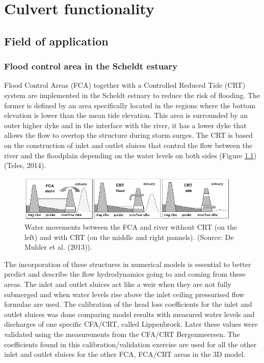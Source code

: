 \chapter{Culvert functionality}

\section{Field of application}

\subsection{Flood control area in the Scheldt estuary}
Flood Control Areas (FCA) together with a Controlled Reduced Tide (CRT) system
are implemented in the Scheldt estuary to reduce the risk of flooding.
The former is defined by an area specifically located in the regions where
the bottom elevation is lower than the mean tide elevation.
This area is surrounded by an outer higher dyke and in the interface with the river,
it has a lower dyke that allows the flow to overtop the structure during storm surges.
The CRT is based on the construction of inlet and outlet sluices that control the
flow between the river and the floodplain depending on the water levels on both
sides (Figure \ref{fig:culvert_fig1}) (Teles, 2014).

\begin{figure}[H]
\begin{center}
  \includegraphics[width=0.95\textwidth]{culvert_fig1.png}
\end{center}
\caption{Water movements between the FCA and river without
CRT (on the left) and with CRT (on the middle and right pannels).
(Source: De Mulder et al. (2013)).}
\label{fig:culvert_fig1}
\end{figure}

The incorporation of these structures in numerical models is essential
to better predict and describe the flow hydrodynamics going to and
coming from these areas. The inlet and outlet sluices act like a weir
when they are not fully submerged and when water levels rise above the
inlet ceiling pressurised flow formulae are used.
The calibration of the head loss coefficients for the inlet and outlet sluices
was done comparing model results with measured water levels and discharges of
one specific CFA/CRT, called Lippenbroek.
Later these values were validated using the measurements from the CFA/CRT Bergenmeersen.
The coefficients found in this calibration/validation exercise are used for all the
other inlet and outlet sluices for the other FCA, FCA/CRT areas in the 3D model.

